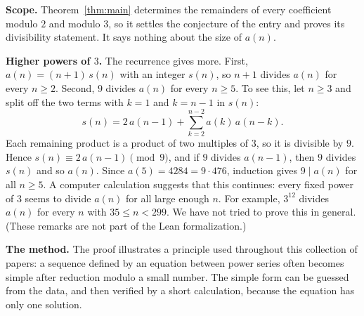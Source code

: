 \documentclass[11pt,a4paper]{article}
\theoremstyle{definition}
\theoremstyle{remark}
\newcommand{\para}[1]{\par\medskip\noindent\textbf{#1}\enspace}
\begin{document}
\para{Scope.} Theorem~\ref{thm:main} determines the remainders of every coefficient modulo $2$ and modulo $3$, so it
settles the conjecture of the entry and proves its divisibility statement. It says nothing about the size of $a(n)$.

\para{Higher powers of $3$.} The recurrence gives more. First, $a(n)=(n+1)\,s(n)$ with an integer $s(n)$, so $n+1$
divides $a(n)$ for every $n\ge2$. Second, $9$ divides $a(n)$ for every $n\ge5$. To see this, let $n\ge3$ and split off the
two terms with $k=1$ and $k=n-1$ in $s(n)$:
\[
s(n)=2\,a(n-1)+\sum_{k=2}^{n-2}a(k)\,a(n-k).
\]
Each remaining product is a product of two multiples of $3$, so it is divisible by $9$. Hence $s(n)\equiv2\,a(n-1)
\pmod9$, and if $9$ divides $a(n-1)$, then $9$ divides $s(n)$ and so $a(n)$. Since $a(5)=4284=9\cdot476$, induction
gives $9\mid a(n)$ for all $n\ge5$. A computer calculation suggests that this continues: every fixed power of $3$ seems to
divide $a(n)$ for all large enough $n$. For example, $3^{12}$ divides $a(n)$ for every $n$ with $35\le n<299$. We have not
tried to prove this in general. (These remarks are not part of the Lean formalization.)

\para{The method.} The proof illustrates a principle used throughout this collection of papers: a sequence defined by an
equation between power series often becomes simple after reduction modulo a small number. The simple form can be guessed
from the data, and then verified by a short calculation, because the equation has only one solution.
\end{document}
